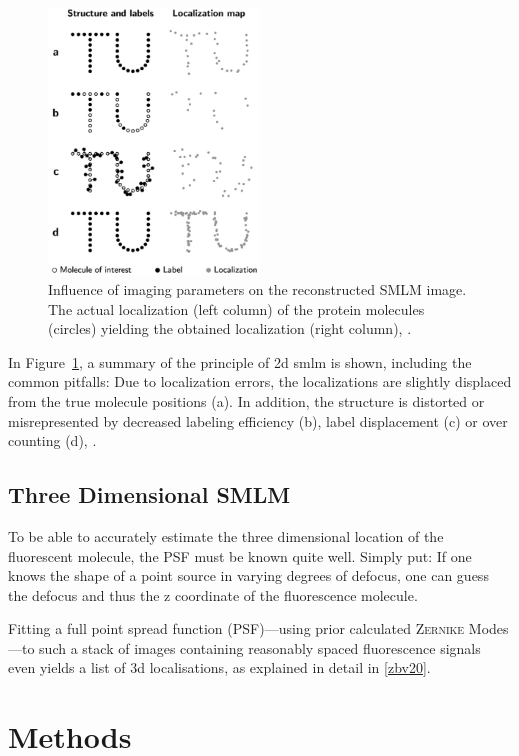 \documentclass[11pt, a4paper, oneside, twocolumn]{report}
\begin{document}
\begin{figure}[h]
  \centering \includegraphics[width=0.5\textwidth]{2dsmlm.png}
  \caption{Influence of imaging parameters on the reconstructed SMLM
    image. The actual localization (left column) of the protein
    molecules (circles) yielding the obtained localization (right
    column), \cite{smlm}.}
  \label{f:2dsmlm}
\end{figure}

In Figure~\ref{f:2dsmlm}, a summary of the principle of 2d \gls{smlm}
is shown, including the common pitfalls: Due to localization errors,
the localizations are slightly displaced from the true molecule
positions (a). In addition, the structure is distorted or
misrepresented by decreased labeling efficiency (b), label
displacement (c) or over counting (d), \cite{smlm}.


\section{Three Dimensional SMLM}

To be able to accurately estimate the three dimensional location of
the fluorescent molecule, the PSF must be known quite well. Simply
put: If one knows the shape of a point source in varying degrees of
defocus, one can guess the defocus and thus the z coordinate of the
fluorescence molecule.

Fitting a full point spread function (PSF)---using prior calculated
\textsc{Zernike} Modes---to such a stack of images containing
reasonably spaced fluorescence signals even yields a list of 3d
localisations, as explained in detail in \ref{zbv20}.

\clearpage\chapter{Methods}
\end{document}
